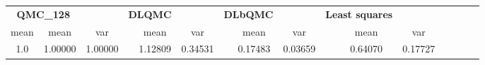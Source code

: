 \begin{tabular}{cccccccccccccccc}
\toprule
\multicolumn{2}{c}{\textbf{QMC\_128}}&&\multicolumn{2}{c}{\textbf{DLQMC}}&&\multicolumn{2}{c}{\textbf{DLbQMC}}&&\multicolumn{2}{c}{\textbf{Least squares}}\\ 
\cmidrule(r){2-3} \cmidrule(r){5-6} \cmidrule(r){8-9}
mean &mean&var&&mean&var&&mean&var&&mean&var\\ 
\midrule
1.0 &1.00000&1.00000&&1.12809&0.34531&&0.17483&0.03659&&0.64070&0.17727\\ 
\bottomrule
\end{tabular}

